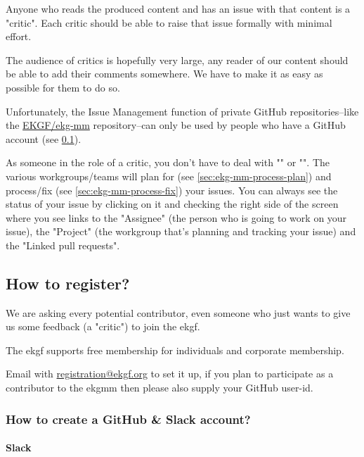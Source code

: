 Anyone who reads the produced content and has an issue with that content is a "critic".
Each critic should be able to raise that issue formally with minimal effort.

The audience of critics is hopefully very large, any reader of our content should
be able to add their comments somewhere.
We have to make it as easy as possible for them to do so. 

Unfortunately, the Issue Management function of private GitHub repositories--like
the \href{https://github.com/ekgf/ekg-mm}{EKGF/ekg-mm} repository--can only be
used by people who have a GitHub account (see \ref{subsec:ekg-mm-process-how-to-register}).

As someone in the role of a critic, you don’t have to deal with ""
or "". 
The various workgroups/teams will plan for (see \ref{sec:ekg-mm-process-plan})
and process/fix (see \ref{sec:ekg-mm-process-fix}) your issues. 
You can always see the status of your issue by clicking on it and checking 
the right side of the screen where you see links to the "Assignee"
(the person who is going to work on your issue), the "Project"
(the workgroup that’s planning and tracking your issue) and the "Linked pull requests". 

\subsection{How to register?}
\label{subsec:ekg-mm-process-how-to-register}

We are asking every potential contributor, even someone who just wants to give us
some feedback (a "critic") to join the \gls{ekgf}.

The \gls{ekgf} supports free membership for individuals and corporate membership.

Email with \href{mailto:registration@ekgf.org}{registration@ekgf.org} to set it up,
if you plan to participate as a contributor to the \gls{ekgmm} then please also
supply your GitHub user-id.

\subsubsection{How to create a GitHub \& Slack account?}

\paragraph{Slack}

